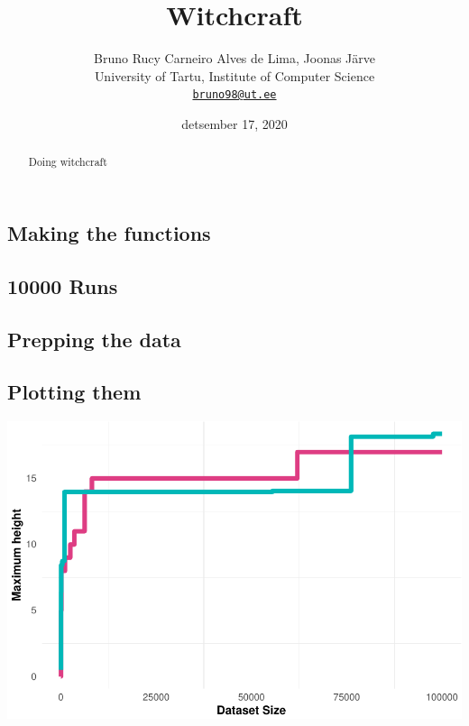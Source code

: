 \documentclass[
  11pt,
]{article}
\title{Witchcraft}
\author{Bruno Rucy Carneiro Alves de Lima, Joonas Järve\\
University of Tartu, Institute of Computer Science\\
\href{mailto:bruno98@ut.ee}{\nolinkurl{bruno98@ut.ee}}}
\date{detsember 17, 2020}
\begin{document}
\maketitle
\begin{abstract}
Doing witchcraft
\end{abstract}

\hypertarget{making-the-functions}{%
\subsection{Making the functions}\label{making-the-functions}}

\hypertarget{runs}{%
\subsection{10000 Runs}\label{runs}}

\hypertarget{prepping-the-data}{%
\subsection{Prepping the data}\label{prepping-the-data}}

\hypertarget{plotting-them}{%
\subsection{Plotting them}\label{plotting-them}}

\includegraphics{rng_approx_files/figure-latex/unnamed-chunk-4-1.pdf}
\end{document}
